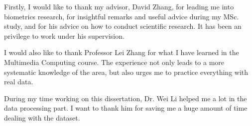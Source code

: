 %

Firstly, I would like to thank my advisor, David Zhang, for leading me into biometrics research, for insightful remarks and useful advice during my MSc. study, and for his advice on how to conduct scientific research. It has been an privilege to work under his supervision.

I would also like to thank Professor Lei Zhang for what I have learned in the Multimedia Computing course. The experience not only leads to a more systematic knowledge of the area, but also urges me to practice everything with real data.

During my time working on this dissertation, Dr. Wei Li helped me a lot in the data processing part. I want to thank him for saving me a huge amount of time dealing with the dataset.